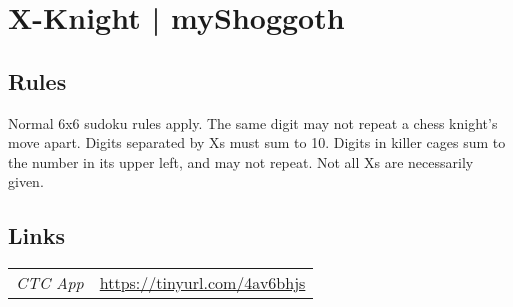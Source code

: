 \section{X-Knight | {\normalfont myShoggoth}}
\label{sec:01-x-knight-myshoggoth}

\subsection*{Rules}
\begin{markdown}
Normal 6x6 sudoku rules apply. The same digit may not repeat a chess knight's move apart. Digits separated by Xs must sum to 10. Digits in killer cages sum to the number in its upper left, and may not repeat. Not all Xs are necessarily given.
\end{markdown}
\subsection*{Links}
\begin{tabularx}{\textwidth}{l X}
\emph{CTC App} & \url{https://tinyurl.com/4av6bhjs} \\
\end{tabularx}
\pagebreak
